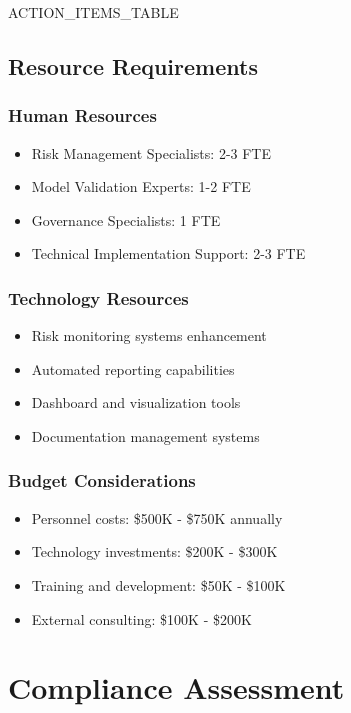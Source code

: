 \documentclass[11pt,a4paper]{article}
\begin{document}
{{ACTION_ITEMS_TABLE}}

\subsection{Resource Requirements}

\subsubsection{Human Resources}
\begin{itemize}
\item Risk Management Specialists: 2-3 FTE
\item Model Validation Experts: 1-2 FTE
\item Governance Specialists: 1 FTE
\item Technical Implementation Support: 2-3 FTE
\end{itemize}

\subsubsection{Technology Resources}
\begin{itemize}
\item Risk monitoring systems enhancement
\item Automated reporting capabilities
\item Dashboard and visualization tools
\item Documentation management systems
\end{itemize}

\subsubsection{Budget Considerations}
\begin{itemize}
\item Personnel costs: \$500K - \$750K annually
\item Technology investments: \$200K - \$300K
\item Training and development: \$50K - \$100K
\item External consulting: \$100K - \$200K
\end{itemize}

\newpage

\section{Compliance Assessment}
\end{document}
